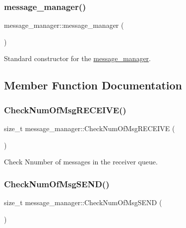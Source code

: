 \subsubsection{\texorpdfstring{message\+\_\+manager()}{message\_manager()}}
{\footnotesize\ttfamily message\+\_\+manager\+::message\+\_\+manager (\begin{DoxyParamCaption}{ }\end{DoxyParamCaption})}



Standard constructor for the \hyperlink{classmessage__manager}{message\+\_\+manager}. 



\subsection{Member Function Documentation}
\mbox{\label{classmessage__manager_a4bcbca2647a5bd5fa34fc01b36a9761a}} 
\subsubsection{\texorpdfstring{Check\+Num\+Of\+Msg\+R\+E\+C\+E\+I\+V\+E()}{CheckNumOfMsgRECEIVE()}}
{\footnotesize\ttfamily size\+\_\+t message\+\_\+manager\+::\+Check\+Num\+Of\+Msg\+R\+E\+C\+E\+I\+VE (\begin{DoxyParamCaption}{ }\end{DoxyParamCaption})}



Check Nnumber of messages in the receiver queue. 

\mbox{\label{classmessage__manager_a83ad668e1cd4566d4d7936ed16e41c83}} 
\subsubsection{\texorpdfstring{Check\+Num\+Of\+Msg\+S\+E\+N\+D()}{CheckNumOfMsgSEND()}}
{\footnotesize\ttfamily size\+\_\+t message\+\_\+manager\+::\+Check\+Num\+Of\+Msg\+S\+E\+ND (\begin{DoxyParamCaption}{ }\end{DoxyParamCaption})}



